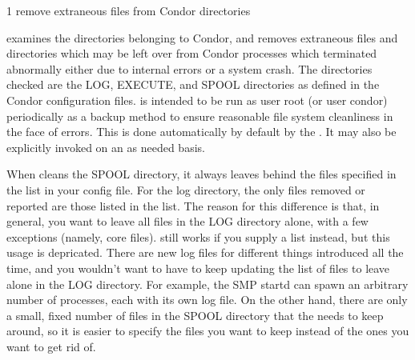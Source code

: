 \begin{ManPage}{\label{man-condor-preen}}{1}
{remove extraneous files from Condor directories}
\Synopsis {}

\Description 

 examines the directories belonging to Condor, 
and removes extraneous files and directories which may be left over from
Condor processes which terminated abnormally either due to internal errors or
a system crash. The directories checked are the LOG, EXECUTE, and SPOOL
directories as defined in the Condor configuration files.  is
intended to be run as user root (or user condor) periodically as a backup
method to ensure reasonable file system cleanliness in the face of
errors. This is done automatically by default by the . 
It may also be explicitly invoked on an as needed basis.

When  cleans the SPOOL directory, it always leaves
behind the files specified in the  list in
your config file.
For the log directory, the only files removed or reported are those
listed in the   list.
The reason for this difference is that, in general, you want to leave
all files in the LOG directory alone, with a few exceptions (namely,
core files).
 still works if you supply a 
list instead, but this usage is depricated.
There are new log files for different things introduced all the time,
and you wouldn't want to have to keep updating the list of files to
leave alone in the LOG directory.
For example, the SMP startd can spawn an arbitrary number of
 processes, each with its own log file.  
On the other hand, there are only a small, fixed number of files in
the SPOOL directory that the  needs to keep around, so
it is easier to specify the files you want to keep instead of the ones
you want to get rid of.

\begin{Options}




\end{Options}

\end{ManPage}
